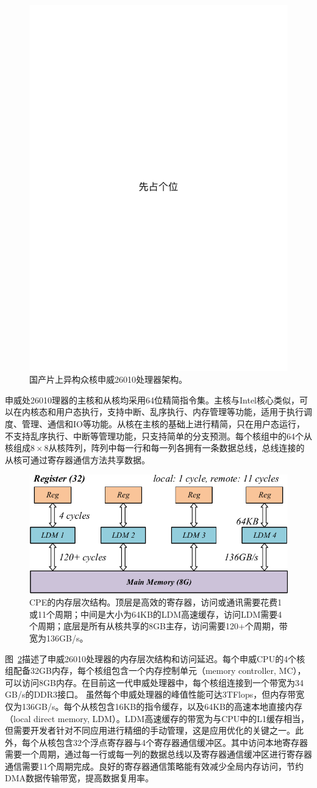 \documentclass[degree=doctor]{thuthesis}
\begin{document}
\begin{figure}[ht]
\centering
\includegraphics[width=.3\columnwidth]{placeholder.pdf}
\caption{国产片上异构众核申威26010处理器架构。}
\label{fig:sunwaycpu}
\end{figure}

申威处26010理器的主核和从核均采用64位精简指令集。主核与Intel核心类似，可以在内核态和用户态执行，支持中断、乱序执行、内存管理等功能，适用于执行调度、管理、通信和IO等功能。从核在主核的基础上进行精简，只在用户态运行，不支持乱序执行、中断等管理功能，只支持简单的分支预测。每个核组中的64个从核组成$8\times8$从核阵列，阵列中每一行和每一列各拥有一条数据总线，总线连接的从核可通过寄存器通信方法共享数据。

\begin{figure}[ht]
\centering
\includegraphics[width=.8\columnwidth]{memory_hierarchy.pdf}
\caption{CPE的内存层次结构。顶层是高效的寄存器，访问或通讯需要花费1或11个周期；中间是大小为64KB的LDM高速缓存，访问LDM需要4个周期；底层是所有从核共享的8GB主存，访问需要120+个周期，带宽为136GB/s。}
\label{fig:sunway_mem}
\end{figure}

图~\ref {fig:sunway_mem}描述了申威26010处理器的内存层次结构和访问延迟。每个申威CPU的4个核组配备32GB内存，每个核组包含一个内存控制单元（memory controller, MC），可以访问8GB内存。在目前这一代申威处理器中，每个核组连接到一个带宽为34 GB/s的DDR3接口。 虽然每个申威处理器的峰值性能可达3TFlops，但内存带宽仅为136GB/s。每个从核包含16KB的指令缓存，以及64KB的高速本地直接内存（local direct memory, LDM）。LDM高速缓存的带宽为与CPU中的L1缓存相当，但需要开发者针对不同应用进行精细的手动管理，这是应用优化的关键之一。此外，每个从核包含32个浮点寄存器与4个寄存器通信缓冲区。其中访问本地寄存器需要一个周期，通过每一行或每一列的数据总线以及寄存器通信缓冲区进行寄存器通信需要11个周期完成。良好的寄存器通信策略能有效减少全局内存访问，节约DMA数据传输带宽，提高数据复用率。
\end{document}
